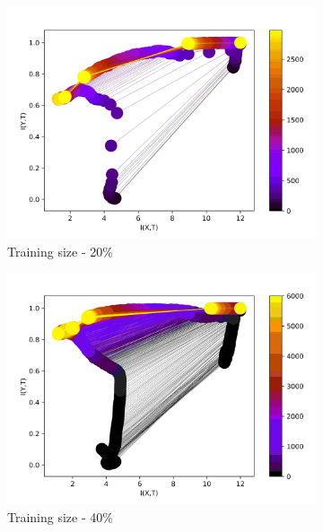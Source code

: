 \documentclass[dissertation.tex]{subfiles}
\begin{document}
\begin{figure}[ht]
  \centering
  \begin{subfigure}[t]{0.32\textwidth}
    \centering
    \includegraphics[width=\textwidth]{figs/eval/trainingSize/Binning20.jpg}
    \caption{
      Training size - 20\%
    }
    \label{figBinningTS20}
  \end{subfigure}
  \begin{subfigure}[t]{0.32\textwidth}
    \centering
    \includegraphics[width=\textwidth]{figs/eval/trainingSize/Binning40.jpg}
    \caption{
      Training size - 40\%
    }
    \label{figBinningTS40}
  \end{subfigure}
  \begin{subfigure}[t]{0.32\textwidth}

\end{subfigure}
\end{figure}
\end{document}
